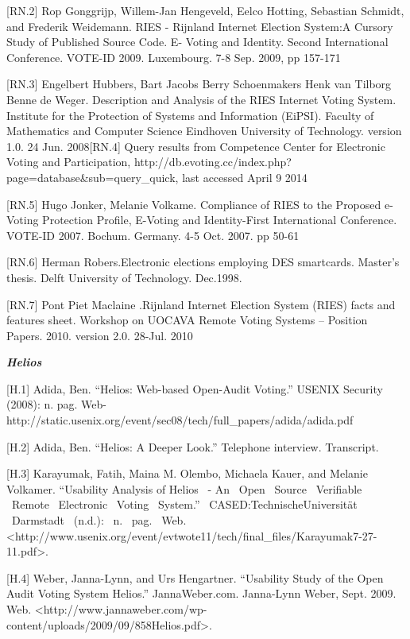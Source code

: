 [RN.2] Rop Gonggrijp, Willem-Jan Hengeveld, Eelco Hotting, Sebastian Schmidt, and Frederik Weidemann. RIES - Rijnland Internet Election System:A Cursory Study of Published Source Code. E- Voting and Identity. Second International Conference. VOTE-ID 2009. Luxembourg. 7-8 Sep. 2009, pp 157-171

[RN.3] Engelbert Hubbers, Bart Jacobs Berry Schoenmakers Henk van Tilborg Benne de Weger. Description and Analysis of the RIES Internet Voting System. Institute for the Protection of Systems and Information (EiPSI). Faculty of Mathematics and Computer Science Eindhoven University of Technology. version 1.0. 24 Jun. 2008[RN.4] Query results from Competence Center for Electronic Voting and Participation, \textcolor[rgb]{0.078431375,0.3254902,0.6901961}{http://db.evoting.cc/index.php?page=database\&sub=query\_quick, }last accessed April 9 2014

[RN.5] Hugo Jonker, Melanie Volkame. Compliance of RIES to the Proposed e-Voting Protection Profile, E-Voting and Identity-First International Conference. VOTE-ID 2007. Bochum. Germany. 4-5 Oct. 2007. pp 50-61

[RN.6] Herman Robers.Electronic elections employing DES smartcards. Master's thesis. Delft University of Technology. Dec.1998.

[RN.7] Pont Piet Maclaine .Rijnland Internet Election System (RIES) facts and features sheet. Workshop on UOCAVA Remote Voting Systems -- Position Papers. 2010. version 2.0. 28-Jul. 2010

\textbf{\textit{Helios}}

[H.1] Adida, Ben. ``Helios: Web-based Open-Audit Voting.'' USENIX Security (2008): n. pag. Web- \textcolor[rgb]{0.078431375,0.3254902,0.6901961}{http://static.usenix.org/event/sec08/tech/full\_papers/adida/adida.pdf}

[H.2] Adida, Ben. ``Helios: A Deeper Look.'' Telephone interview. Transcript.

[H.3] Karayumak, Fatih, Maina M. Olembo, Michaela Kauer, and Melanie Volkamer. ``Usability Analysis of Helios ~- An ~Open ~Source ~Verifiable ~Remote ~Electronic ~Voting ~System.'' ~CASED:TechnischeUniversität ~Darmstadt ~(n.d.): ~n. ~pag. ~Web. ~ {\textless}http://www.usenix.org/event/evtwote11/tech/final\_files/Karayumak7-27-11.pdf{\textgreater}.

[H.4] Weber, Janna-Lynn, and Urs Hengartner. ``Usability Study of the Open Audit Voting System Helios.'' JannaWeber.com. Janna-Lynn Weber, Sept. 2009. Web. {\textless}http://www.jannaweber.com/wp- \textcolor[rgb]{0.078431375,0.3254902,0.6901961}{content/uploads/2009/09/858Helios.pdf{\textgreater}.}

